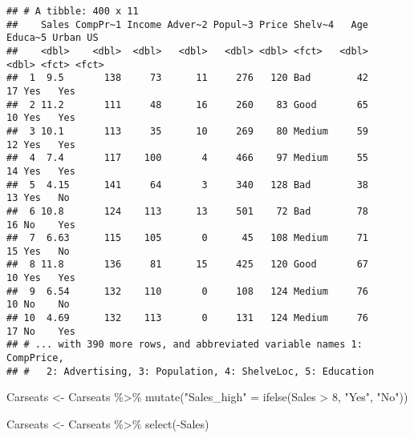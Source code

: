 \documentclass[
]{article}
\newenvironment{Shaded}{\begin{snugshade}}{\end{snugshade}}
\newcommand{\DecValTok}[1]{\textcolor[rgb]{0.00,0.00,0.81}{#1}}
\newcommand{\FunctionTok}[1]{\textcolor[rgb]{0.00,0.00,0.00}{#1}}
\newcommand{\NormalTok}[1]{#1}
\newcommand{\OtherTok}[1]{\textcolor[rgb]{0.56,0.35,0.01}{#1}}
\newcommand{\SpecialCharTok}[1]{\textcolor[rgb]{0.00,0.00,0.00}{#1}}
\newcommand{\StringTok}[1]{\textcolor[rgb]{0.31,0.60,0.02}{#1}}
\begin{document}
\begin{verbatim}
## # A tibble: 400 x 11
##    Sales CompPr~1 Income Adver~2 Popul~3 Price Shelv~4   Age Educa~5 Urban US   
##    <dbl>    <dbl>  <dbl>   <dbl>   <dbl> <dbl> <fct>   <dbl>   <dbl> <fct> <fct>
##  1  9.5       138     73      11     276   120 Bad        42      17 Yes   Yes  
##  2 11.2       111     48      16     260    83 Good       65      10 Yes   Yes  
##  3 10.1       113     35      10     269    80 Medium     59      12 Yes   Yes  
##  4  7.4       117    100       4     466    97 Medium     55      14 Yes   Yes  
##  5  4.15      141     64       3     340   128 Bad        38      13 Yes   No   
##  6 10.8       124    113      13     501    72 Bad        78      16 No    Yes  
##  7  6.63      115    105       0      45   108 Medium     71      15 Yes   No   
##  8 11.8       136     81      15     425   120 Good       67      10 Yes   Yes  
##  9  6.54      132    110       0     108   124 Medium     76      10 No    No   
## 10  4.69      132    113       0     131   124 Medium     76      17 No    Yes  
## # ... with 390 more rows, and abbreviated variable names 1: CompPrice,
## #   2: Advertising, 3: Population, 4: ShelveLoc, 5: Education
\end{verbatim}

\begin{Shaded}
\begin{Highlighting}[]
\NormalTok{Carseats }\OtherTok{\textless{}{-}}\NormalTok{ Carseats }\SpecialCharTok{\%\textgreater{}\%} \FunctionTok{mutate}\NormalTok{(}\StringTok{"Sales\_high"} \OtherTok{=} \FunctionTok{ifelse}\NormalTok{(Sales }\SpecialCharTok{\textgreater{}} \DecValTok{8}\NormalTok{, }\StringTok{"Yes"}\NormalTok{, }\StringTok{"No"}\NormalTok{))}
\end{Highlighting}
\end{Shaded}

\begin{Shaded}
\end{Shaded}

\begin{Shaded}
\begin{Highlighting}[]
\NormalTok{Carseats }\OtherTok{\textless{}{-}}\NormalTok{ Carseats }\SpecialCharTok{\%\textgreater{}\%} \FunctionTok{select}\NormalTok{(}\SpecialCharTok{{-}}\NormalTok{Sales)}
\end{Highlighting}
\end{Shaded}
\end{document}
